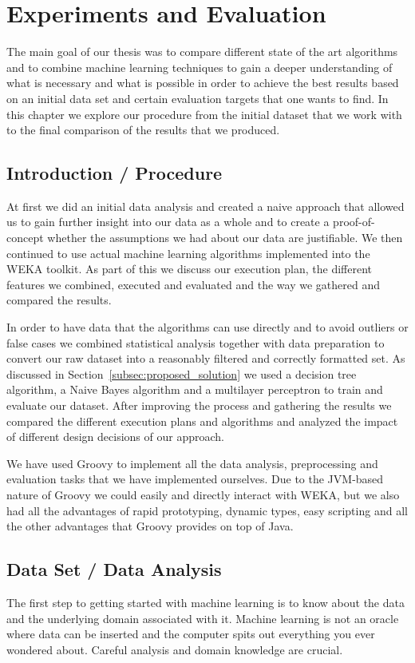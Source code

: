 \newpage
\section{Experiments and Evaluation}
\label{sec:experiments}

The main goal of our thesis was to compare different state of the art algorithms and to combine machine learning techniques to gain a deeper understanding of what is necessary and what is possible in order to achieve the best results based on an initial data set and certain evaluation targets that one wants to find. In this chapter we explore our procedure from the initial dataset that we work with to the final comparison of the results that we produced.

\subsection{Introduction / Procedure}

At first we did an initial data analysis and created a naive approach that allowed us to gain further insight into our data as a whole and to create a proof-of-concept whether the assumptions we had about our data are justifiable. 
We then continued to use actual machine learning algorithms implemented into the WEKA toolkit. As part of this we discuss our execution plan, the different features we combined, executed and evaluated and the way we gathered and compared the results.

In order to have data that the algorithms can use directly and to avoid outliers or false cases we combined statistical analysis together with data preparation to convert our raw dataset into a reasonably filtered and correctly formatted set. As discussed in Section~\ref{subsec:proposed_solution} we used a decision tree algorithm, a Naive Bayes algorithm and a multilayer perceptron to train and evaluate our dataset. After improving the process and gathering the results we compared the different execution plans and algorithms and analyzed the impact of different design decisions of our approach.

We have used Groovy to implement all the data analysis, preprocessing and evaluation tasks that we have implemented ourselves. Due to the JVM-based nature of Groovy we could easily and directly interact with WEKA, but we also had all the advantages of rapid prototyping, dynamic types, easy scripting and all the other advantages that Groovy provides on top of Java. 

\subsection{Data Set / Data Analysis}
\label{subsec:data_set}
The first step to getting started with machine learning is to know about the data and the underlying domain associated with it. Machine learning is not an oracle where data can be inserted and the computer spits out everything you ever wondered about. Careful analysis and domain knowledge are crucial. 

